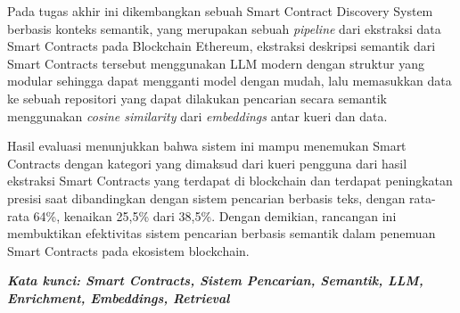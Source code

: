 \begin{singlespace}
	Pada tugas akhir ini dikembangkan sebuah Smart Contract Discovery System berbasis konteks semantik, yang merupakan sebuah \textit{pipeline} dari ekstraksi data Smart Contracts pada Blockchain Ethereum, ekstraksi deskripsi semantik dari Smart Contracts tersebut menggunakan LLM modern dengan struktur yang modular sehingga dapat mengganti model dengan mudah, lalu memasukkan data ke sebuah repositori yang dapat dilakukan pencarian secara semantik menggunakan \textit{cosine similarity} dari \textit{embeddings} antar kueri dan data. 
	
	Hasil evaluasi menunjukkan bahwa sistem ini mampu menemukan Smart Contracts dengan kategori yang dimaksud dari kueri pengguna dari hasil ekstraksi Smart Contracts yang terdapat di blockchain dan terdapat peningkatan presisi saat dibandingkan dengan sistem pencarian berbasis teks, dengan rata-rata 64\%, kenaikan 25,5\% dari 38,5\%. Dengan demikian, rancangan ini membuktikan efektivitas sistem pencarian berbasis semantik dalam penemuan Smart Contracts pada ekosistem blockchain.

	\textbf{\textit{Kata kunci: Smart Contracts, Sistem Pencarian, Semantik, LLM, Enrichment, Embeddings, Retrieval}}

\end{singlespace}
\clearpage